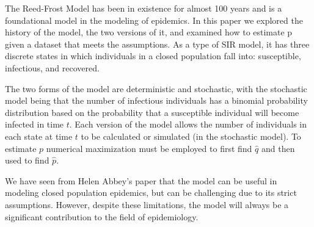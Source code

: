 The Reed-Frost Model has been in existence for almost 100 years and is a foundational model in the modeling of epidemics. In this paper we explored the history of the model, the two versions of it, and examined how to estimate p given a dataset that meets the assumptions. As a type of SIR model, it has three discrete states in which individuals in a closed population fall into: susceptible, infectious, and recovered. 

The two forms of the model are deterministic and stochastic, with the stochastic model being that the number of infectious individuals has a binomial probability distribution based on the probability that a susceptible individual will become infected in time $t$. Each version of the model allows the number of individuals in each state at time $t$ to be calculated or simulated (in the stochastic model). To estimate $p$ numerical maximization must be employed to first find $\hat{q}$ and then used to find $\hat{p}$. 

We have seen from Helen Abbey's paper that the model can be useful in modeling closed population epidemics, but can be challenging due to its strict assumptions. However, despite these limitations, the model will always be a significant contribution to the field of epidemiology.
